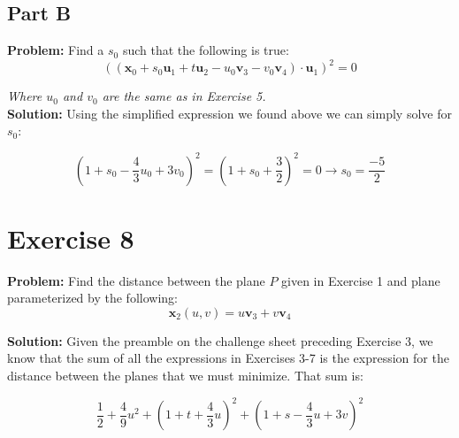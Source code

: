\documentclass{article}
\begin{document}
\subsection*{Part B}
\textbf{Problem:} Find a $s_0$ such that the following is true:
$$((\mathbf x_0+s_0\mathbf u_1+t\mathbf u_2-u_0\mathbf v_3-v_0\mathbf v_4)\cdot\mathbf u_1)^2=0$$

\textit{Where $u_0$ and $v_0$ are the same as in Exercise 5.}
\\
\textbf{Solution:} Using the simplified expression we found above we can simply solve for $s_0$:

$$\left(1+s_0-\frac{4}{3}u_0+3v_0\right)^2=\left(1+s_0+\frac{3}{2}\right)^2=0\rightarrow \boxed{s_0=\frac{-5}{2}}$$

\section*{Exercise 8}
\textbf{Problem:} Find the distance between the plane $P$ given in Exercise 1 and plane parameterized by the following:
$$\mathbf x_2(u,v)=u\mathbf v_3+v\mathbf v_4$$

\textbf{Solution:} Given the preamble on the challenge sheet preceding Exercise 3, we know that the sum of all the expressions in Exercises 3-7 is the expression for the distance between the planes that we must minimize. That sum is:

$$\frac{1}{2}+\frac{4}{9}u^2+\left(1+t+\frac{4}{3}u\right)^2+\left(1+s-\frac{4}{3}u+3v\right)^2$$

%
%
%
%
%
\end{document}
